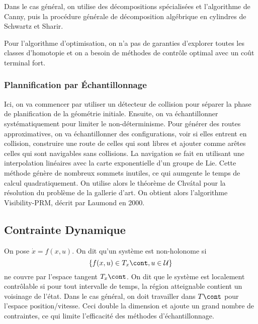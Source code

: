 \documentclass[math]{cours}
\begin{document}
Dans le cas général, on utilise des décompositions spécialisées et l'algorithme de Canny, puis la procédure générale de décomposition algébrique en cylindres de Schwartz et Sharir.

Pour l'algorithme d'optimisation, on n'a pas de garanties d'explorer toutes les classes d'homotopie et on a besoin de méthodes de contrôle optimal avec un coût terminal fort.

\subsubsection{Plannification par Échantillonnage}
Ici, on va commencer par utiliser un détecteur de collision pour séparer la phase de planification de la géométrie initiale.
Ensuite, on va échantillonner systématiquement pour limiter le non-déterminisme.
Pour générer des routes approximatives, on va échantillonner des configurations, voir si elles entrent en collision, construire une route de celles qui sont libres et ajouter comme arêtes celles qui sont navigables sans collisions.
La navigation se fait en utilisant une interpolation linéaires avec la carte exponentielle d'un groupe de Lie.
Cette méthode génère de nombreux sommets inutiles, ce qui aumgente le temps de calcul quadratiquement.
On utilise alors le théorème de Chvátal pour la résolution du problème de la gallerie d'art.
On obtient alors l'algorithme Visibility-PRM, décrit par Laumond en 2000.

\subsection{Contrainte Dynamique}
On pose $\dot{x} = f(x, u)$.
On dit qu'un système est non-holonome si
\begin{equation*}
	\left\{f(x, u) \in T_{x}\cont, u \in \mathcal{U} \right\}
\end{equation*}
ne couvre par l'espace tangent $T_{x}\cont$.
On dit que le système est localement contrôlable si pour tout intervalle de temps, la région atteignable contient un voisinage de l'état.
Dans le cas général, on doit travailler dans $T\cont$ pour l'espace position/vitesse.
Ceci double la dimension et ajoute un grand nombre de contraintes, ce qui limite l'efficacité des méthodes d'échantillonnage.
\end{document}
